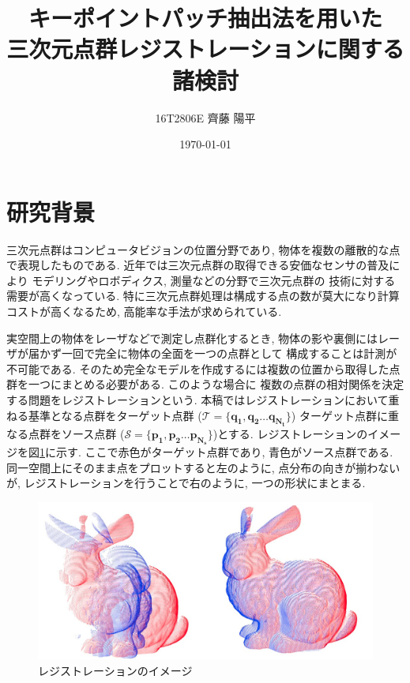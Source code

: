 \documentclass[twocolumn, 9pt, a4j, dvipdfmx]{jsarticle}
\title{
    キーポイントパッチ抽出法を用いた\\
    三次元点群レジストレーションに関する諸検討
}
\author{16T2806E 齊藤 陽平}
\date{\today}
\begin{document}
\vspace{5cm}
\maketitle
\section{研究背景}
三次元点群はコンピュータビジョンの位置分野であり, 
物体を複数の離散的な点で表現したものである.
近年では三次元点群の取得できる安価なセンサの普及により
モデリングやロボディクス, 測量などの分野で三次元点群の
技術に対する需要が高くなっている. 
特に三次元点群処理は構成する点の数が莫大になり計算コストが高くなるため, 
高能率な手法が求められている.

実空間上の物体をレーザなどで測定し点群化するとき,
物体の影や裏側にはレーザが届かず一回で完全に物体の全面を一つの点群として
構成することは計測が不可能である.
そのため完全なモデルを作成するには複数の位置から取得した点群を一つにまとめる必要がある. 
このような場合に
複数の点群の相対関係を決定する問題をレジストレーションという. 
本稿ではレジストレーションにおいて重ねる基準となる点群をターゲット点群
($\mathcal{T}=\{\bm{q_1}, \bm{q_2}\ldots\bm{q_{N_t}}\}$)
ターゲット点群に重なる点群をソース点群
($\mathcal{S}=\{\bm{p_1}, \bm{p_2}\ldots\bm{p_{N_s}}\}$)とする. 
レジストレーションのイメージを図\ref{registration}に示す. 
ここで赤色がターゲット点群であり, 青色がソース点群である. 
同一空間上にそのまま点をプロットすると左のように, 
点分布の向きが揃わないが, レジストレーションを行うことで右のように, 
一つの形状にまとまる. 
\vspace{-2mm}
\begin{figure}[H]
    \centering
    \includegraphics[clip, width=0.8\linewidth]{./img/registration.png}
    \caption{レジストレーションのイメージ\label{registration}}
\end{figure}
\vspace{-10mm}
\end{document}
